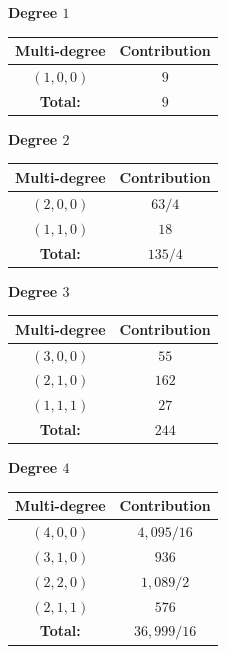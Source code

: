 \documentclass[11pt]{amsart}
\theoremstyle{definition}
\theoremstyle{definition}
\begin{document}
\begin{center}
\begin{minipage}[t]{0.4\textwidth}
\noindent \center\textbf{Degree $1$}\\
\begin{tabular}{| c | c |}
	\hline
	\textbf{Multi-degree} & \textbf{Contribution} \\
	\hline \hline
	$(1,0,0)$ & $9$ \\
	\hline \hline
	\textbf{Total:} & $9$ \\
	\hline
\end{tabular}\medskip
\noindent \center\textbf{Degree $2$}\\
\begin{tabular}{| c | c |}
	\hline
	\textbf{Multi-degree} & \textbf{Contribution} \\
	\hline \hline
	$(2,0,0)$ & $63/4$ \\
	\hline
	$(1,1,0)$ & $18$ \\
	\hline \hline
	\textbf{Total:} & $135/4$ \\
	\hline
\end{tabular}\medskip
\noindent \center\textbf{Degree $3$}\\
\begin{tabular}{| c | c |}
	\hline
	\textbf{Multi-degree} & \textbf{Contribution} \\
	\hline \hline
	$(3,0,0)$ & $55$ \\
	\hline
	$(2,1,0)$ & $162$ \\
	\hline 
	$(1,1,1)$ & $27$ \\
	\hline\hline
	\textbf{Total:} & $244$ \\
	\hline
\end{tabular}\medskip
\noindent \center\textbf{Degree $4$}\\
\begin{tabular}{| c | c |}
	\hline
	\textbf{Multi-degree} & \textbf{Contribution} \\
	\hline \hline
	$(4,0,0)$ & $4,\!095/16$ \\
	\hline
	$(3,1,0)$ &  $936$ \\
	\hline 
	$(2,2,0)$ &  $1,\!089/2$ \\
	\hline
	$(2,1,1)$ & $576$ \\
	\hline\hline
	\textbf{Total:} & $36,\!999/16$ \\
	\hline
\end{tabular}
\end{minipage}

\end{center}
\end{document}
